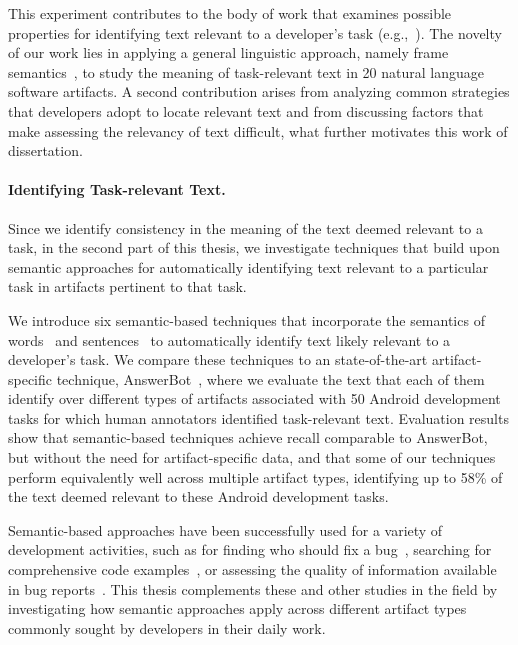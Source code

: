 This experiment contributes to the body of work that examines possible properties for identifying text relevant to a developer's task (e.g.,~\cite{Forward2002, Jiang2016b, Robillard2015, Bavota2016}).
The novelty of our work lies in 
applying a general
linguistic approach, namely frame semantics~\cite{fillmore1976frame, Baker1998}, 
to study the meaning of task-relevant text in 20 natural language software artifacts.
A second contribution arises from analyzing
common strategies that developers adopt to locate relevant text 
and from discussing
factors that make assessing the relevancy of text difficult,
what further motivates this work of dissertation.






\paragraph{\textbf{Identifying Task-relevant Text.}} 


Since we identify consistency in the meaning of the text deemed relevant to a task, 
in the second part of this thesis, we investigate
techniques that build upon semantic approaches 
for automatically identifying text relevant to a particular task in artifacts pertinent to that task.


We introduce six semantic-based techniques that incorporate the semantics of words~\cite{Mikolov2013, Devlin2018Bert}
and sentences~\cite{fillmore1976frame, marques2021}
to automatically identify text likely relevant to a developer's task.
We compare these techniques to an state-of-the-art artifact-specific technique, AnswerBot~\cite{Xu2017},
where we evaluate the text that each of them identify
 over different types of artifacts
associated with 50 Android development tasks 
for which human annotators identified task-relevant text.
Evaluation results show that semantic-based techniques
achieve recall comparable to AnswerBot, but without the need for artifact-specific data,
and that some of our techniques perform equivalently well across
multiple artifact types, identifying up to 58\%
of the text 
deemed relevant to these Android development tasks.


Semantic-based approaches have been successfully used for a variety of development activities, such as
for finding who should fix a bug~\cite{yang2016}, searching for comprehensive code examples~\cite{silva2019},
or assessing the quality of information available in bug reports~\cite{chaparro2019}.
This thesis complements these and other studies in the field
by investigating how semantic approaches apply across different artifact types
commonly sought by developers in their daily work.





